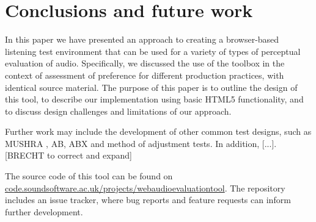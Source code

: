 \documentclass{article}
\begin{document}
\section{Conclusions and future work}\label{sec:conclusions}

In this paper we have presented an approach to creating a browser-based listening test environment that can be used for a variety of types of perceptual evaluation of audio. 
Specifically, we discussed the use of the toolbox in the context of assessment of preference for different production practices, with identical source material. 
The purpose of this paper is to outline the design of this tool, to describe our implementation using basic HTML5 functionality, and to discuss design challenges and limitations of our approach. %

Further work may include the development of other common test designs, such as MUSHRA \cite{mushra}, AB, ABX and method of adjustment tests. 
In addition, [...]. 
[BRECHT to correct and expand]



The source code of this tool can be found on \url{code.soundsoftware.ac.uk/projects/webaudioevaluationtool}. The repository includes an issue tracker, where bug reports and feature requests can inform further development. 



\end{document}
